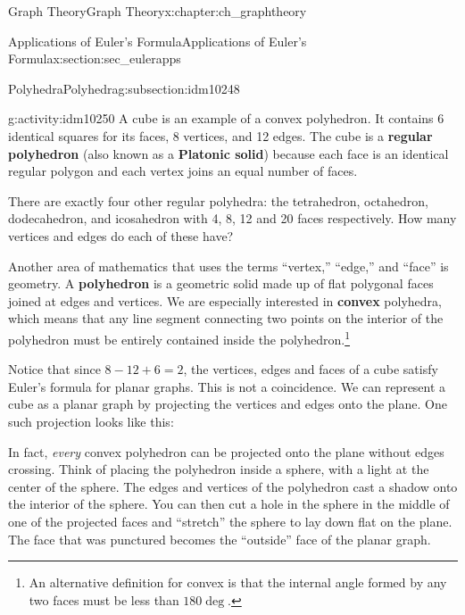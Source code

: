 \documentclass[oneside,10pt,]{book}
\newcommand{\terminology}[1]{\textbf{#1}}
\numberwithin{equation}{chapter}
\newcommand{\vtx}[2]{node[fill,circle,inner sep=0pt, minimum size=4pt,label=#1:#2]{}}
\renewcommand{\v}{\vtx{above}{}}
\begin{document}
\begin{chapterptx}{Graph Theory}{}{Graph Theory}{}{}{x:chapter:ch_graphtheory}
\begin{sectionptx}{Applications of Euler's Formula}{}{Applications of Euler's Formula}{}{}{x:section:sec_eulerapps}
\begin{subsectionptx}{Polyhedra}{}{Polyhedra}{}{}{g:subsection:idm10248}
\begin{activity}{}{g:activity:idm10250}
A cube is an example of a convex polyhedron. It contains 6 identical squares for its faces, 8 vertices, and 12 edges. The cube is a \terminology{regular polyhedron} (also known as a \terminology{Platonic solid}) because each face is an identical regular polygon and each vertex joins an equal number of faces.%
\par
There are exactly four other regular polyhedra: the tetrahedron, octahedron, dodecahedron, and icosahedron with 4, 8, 12 and 20 faces respectively. How many vertices and edges do each of these have?%
\end{activity}
Another area of mathematics that uses the terms ``vertex,'' ``edge,'' and ``face'' is geometry. A \terminology{polyhedron} is a geometric solid made up of flat polygonal faces joined at edges and vertices. We are especially interested in \terminology{convex} polyhedra, which means that any line segment connecting two points on the interior of the polyhedron must be entirely contained inside the polyhedron.\footnote{An alternative definition for convex is that the internal angle formed by any two faces must be less than \(180\deg\).\label{g:fn:idm10270}}%
\par
Notice that since \(8 - 12 + 6 = 2\), the vertices, edges and faces of a cube satisfy Euler's formula for planar graphs. This is not a coincidence. We can represent a cube as a planar graph by projecting the vertices and edges onto the plane. One such projection looks like this:%
\begin{sidebyside}{1}{0.4}{0.4}{0}%
\begin{sbspanel}{0.2}%
\resizebox{\linewidth}{!}{%
\begin{tikzpicture}
  \foreach \ang in {45, 135, 225, 315} {
  \draw (\ang:.4) \v -- (\ang:1) \v -- (\ang+90:1) (\ang:.4) -- (\ang+90:.4);
  }
  \end{tikzpicture}
}%
\end{sbspanel}%
\end{sidebyside}%
\par
In fact, \emph{every} convex polyhedron can be projected onto the plane without edges crossing. Think of placing the polyhedron inside a sphere, with a light at the center of the sphere. The edges and vertices of the polyhedron cast a shadow onto the interior of the sphere. You can then cut a hole in the sphere in the middle of one of the projected faces and ``stretch'' the sphere to lay down flat on the plane. The face that was punctured becomes the ``outside'' face of the planar graph.%

\end{subsectionptx}
\end{sectionptx}
\end{chapterptx}
\end{document}
